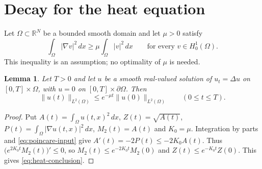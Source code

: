 \documentclass{article}
\newcommand{\Om}{\Omega}
\newtheorem{lemma}{Lemma}
\begin{document}
\section{Decay for the heat equation}
Let $\Om\subset\mathbb R^N$ be a bounded smooth domain and let $\mu>0$
satisfy
\begin{equation}\label{eq:poincare-input}
 \int_{\Om}|\nabla v|^2\,dx\ge\mu\int_{\Om}|v|^2\,dx
 \qquad\text{for every }v\in H_0^1(\Om).
\end{equation}
This inequality is an assumption; no optimality of $\mu$ is needed.
\begin{lemma}\label{lem:heat-decay}
Let $T>0$ and let $u$ be a smooth real-valued solution of
$u_t=\Delta u$ on $[0,T]\times\Om$, with $u=0$ on
$[0,T]\times\partial\Om$. Then
\begin{equation}\label{eq:heat-conclusion}
 \|u(t)\|_{L^2(\Om)}\le e^{-\mu t}\|u(0)\|_{L^2(\Om)}
 \qquad(0\le t\le T).
\end{equation}
\end{lemma}
\begin{proof}
Put $A(t)=\int_{\Om}u(t,x)^2\,dx$, $Z(t)=\sqrt{A(t)}$,
$P(t)=\int_{\Om}|\nabla u(t,x)|^2\,dx$, $M_2(t)=A(t)$ and $K_0=\mu$.
Integration by parts and \eqref{eq:poincare-input} give
$A'(t)=-2P(t)\le-2K_0A(t)$. Thus
$\bigl(e^{2K_0t}M_2(t)\bigr)'\le0$, so
$M_2(t)\le e^{-2K_0t}M_2(0)$ and $Z(t)\le e^{-K_0t}Z(0)$.
This gives \eqref{eq:heat-conclusion}.
\end{proof}
\end{document}
